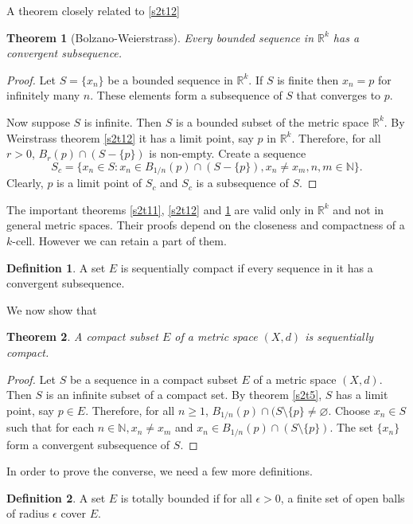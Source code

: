 \documentclass{article}
\theoremstyle{plain}
\newtheorem{thm}{Theorem}
\numberwithin{thm}{section}
\theoremstyle{plain}
\numberwithin{prop}{section}
\theoremstyle{definition}
\newtheorem{defn}{Definition}
\numberwithin{defn}{section}
\theoremstyle{remark}
\numberwithin{equation}{section}
\begin{document}
A theorem closely related to \ref{s2t12}
\begin{thm}[Bolzano-Weierstrass]\label{s2t13}
Every bounded sequence in $\mathbb{R}^k$ has a convergent subsequence.
\end{thm}
\begin{proof}
Let $S = \{x_n\}$ be a bounded sequence in $\mathbb{R}^k$. If $S$ is finite then
$x_n = p$ for infinitely many $n$. These elements form a subsequence of $S$ that
converges to $p$.

Now suppose $S$ is infinite. Then $S$ is a bounded subset of the metric space
$\mathbb{R}^k$. By Weirstrass theorem \ref{s2t12} it has a limit point, say $p$
in $\mathbb{R}^k$. Therefore, for all $r > 0$, $B_r(p) \cap (S - \{p\})$ is
non-empty. Create a sequence
\[
S_c = \{x_n \in S : x_n \in B_{1/n}(p) \cap (S - \{p\}), x_n \ne x_m, n, m \in 
\mathbb{N}\}.
\]
Clearly, $p$ is a limit point of $S_c$ and $S_c$ is a subsequence of $S$.
\end{proof}

The important theorems \ref{s2t11}, \ref{s2t12} and \ref{s2t13} are valid only
in $\mathbb{R}^k$ and not in general metric spaces. Their proofs depend on the
closeness and compactness of a $k$-cell. However we can retain a part of them.
\begin{defn}\label{s2d3}
A set $E$ is sequentially compact if every sequence in it has a convergent
subsequence.
\end{defn}
We now show that
\begin{thm}\label{s2t14}
A compact subset $E$ of a metric space $(X, d)$ is sequentially compact.
\end{thm}
\begin{proof}
Let $S$ be a sequence in a compact subset $E$ of a metric space $(X, d)$. Then
$S$ is an infinite subset of a compact set. By theorem \ref{s2t5}, $S$ has a 
limit point, say $p \in E$. Therefore, for all $n \ge 1$, $B_{1/n}(p) \cap (S
\setminus \{p\} \ne \varnothing$. Choose $x_n \in S$ such that for each $n \in
\mathbb{N}, x_n \ne x_m$ and $x_n \in B_{1/n}(p) \cap (S \setminus \{p\})$. 
The set $\{x_n\}$ form a convergent subsequence of $S$.
\end{proof}

In order to prove the converse, we need a few more definitions.
\begin{defn}\label{s2d4}
A set $E$ is totally bounded if for all $\epsilon > 0$, a finite set of open
balls of radius $\epsilon$ cover $E$.
\end{defn}
\end{document}
